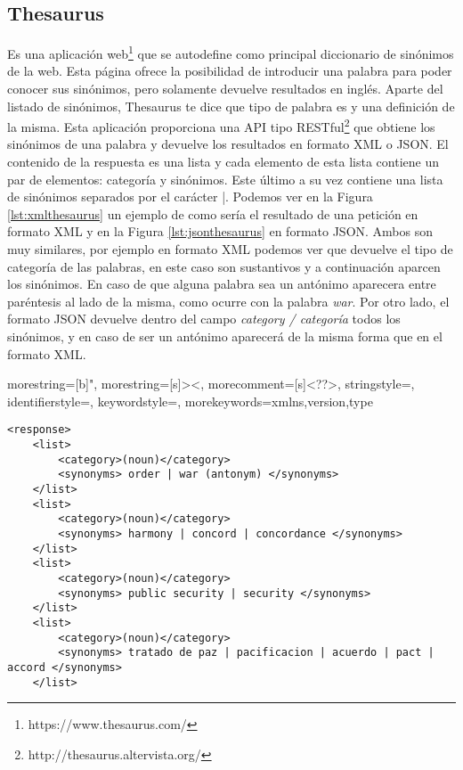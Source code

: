 \subsection{Thesaurus}
\label{cap:subsec:thesaurus}
Es una aplicación web\footnote{https://www.thesaurus.com/} que se autodefine como principal diccionario de sinónimos de la web. Esta página ofrece la posibilidad de introducir una palabra para poder conocer sus sinónimos, pero solamente devuelve resultados en inglés. Aparte del listado de sinónimos,  Thesaurus te dice que tipo de palabra es y una definición de la misma.
Esta aplicación proporciona una API tipo RESTful\footnote{http://thesaurus.altervista.org/} que obtiene los sinónimos de una palabra y devuelve los resultados en formato XML o JSON. El contenido de la respuesta es una lista y cada elemento de esta lista contiene un par de elementos: categoría y sinónimos. Este último a su vez contiene una lista de sinónimos separados por el carácter |. 
Podemos ver en la Figura \ref{lst:xmlthesaurus} un ejemplo de como sería el resultado de una petición en formato XML  y en la Figura \ref{lst:jsonthesaurus} en formato JSON.
Ambos son muy similares, por ejemplo en formato XML podemos ver que devuelve el tipo de categoría de las palabras, en este caso son sustantivos y a continuación aparcen los sinónimos. En caso de que alguna palabra sea un antónimo aparecera entre paréntesis al lado de la misma, como ocurre con la palabra \textit{war}. Por otro lado, el formato JSON devuelve dentro del campo \textit{category / categoría} todos los sinónimos, y en caso de ser un antónimo aparecerá de la misma forma que en el formato XML.






{
	morestring=[b]",
	morestring=[s]{>}{<},
	morecomment=[s]{<?}{?>},
	stringstyle=\color{black},
	identifierstyle=\color{darkblue},
	keywordstyle=\color{cyan},
	morekeywords={xmlns,version,type}%
}



\lstset{language=XML}
\begin{lstlisting}[caption= Ejemplo de salida de Thesaurus en formato XML, label={lst:xmlthesaurus}, frame=single]
<response> 
	<list>
		<category>(noun)</category> 
		<synonyms> order | war (antonym) </synonyms>
	</list>
	<list>
		<category>(noun)</category> 
		<synonyms> harmony | concord | concordance </synonyms>
	</list>
	<list>
		<category>(noun)</category> 
		<synonyms> public security | security </synonyms>
	</list>
	<list>
		<category>(noun)</category> 
		<synonyms> tratado de paz | pacificacion | acuerdo | pact | accord </synonyms>
	</list>
\end{lstlisting}






